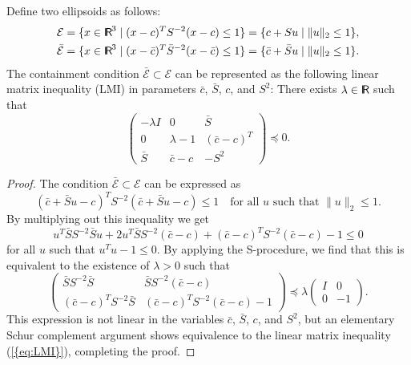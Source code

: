 \documentclass{siamltex}
\providecommand{\norm}[1]{\lVert#1\rVert}
\begin{document}
\begin{lemma}
\label{lem:S_procedure}
Define two ellipsoids as follows:
\begin{align*}
\mathcal{E} &= \{x\in{\makebox{\sf I \hspace{-8.5 pt} R \hspace{-4.0pt}}}^3 \mid (x-c)^T S^{-2} (x-c)\leq 1 \}  =
\{ c + S u \mid \norm{u}_2 \le 1 \},  \\
 \bar{\mathcal{E}} &= \{x\in{\makebox{\sf I \hspace{-8.5 pt} R \hspace{-4.0pt}}}^3 \mid (x-\bar{c})^T \bar{S}^{-2} (x-\bar{c})\leq 1 \}  =
\{\bar{c} + \bar{S}u \mid \norm{u}_2 \leq 1 \}.
\end{align*}
The containment condition $\bar{\mathcal{E}}\subset\mathcal{E}$ can be
represented as the following linear matrix inequality (LMI) in
parameters $\bar{c}$, $\bar{S}$, $c$, and $S^2$: There exists $\lambda
\in {\makebox{\sf I \hspace{-8.5 pt} R \hspace{-4.0pt}}}$ such that
\begin{equation}
\label{eq:LMI}
\begin{pmatrix} - \lambda I &0&\bar{S}\\0& \lambda-1&(\bar{c}-c)^T\\ \bar{S}&\bar{c}-c&-S^2 \end{pmatrix}\preceq 0.
\end{equation}
\end{lemma}
\begin{proof}
  The condition $\bar{\mathcal{E}} \subset \mathcal{E}$ can be
  expressed as
\[
(\bar{c} + \bar{S}u-c)^TS^{-2} (\bar{c} + \bar{S}u-c)\leq 1 \quad \textrm{for all } u  \textrm{ such that }  \norm{u}_2 \leq 1.
\]
By multiplying out this inequality we get
\[
u^T\bar{S}S^{-2}\bar{S}u+2u^T\bar{S}S^{-2} (\bar{c}-c)+(\bar{c}-c)^TS^{-2}(\bar{c}-c)-1\leq 0
\]
for all $u$ such that $u^Tu -1\leq 0$. By applying the S-procedure, we
find that this is equivalent to the existence of $\lambda > 0$ such
that
\begin{equation}
\label{eq:sproc}
\begin{pmatrix} \bar{S}S^{-2} \bar{S}&\bar{S}S^{-2} (\bar{c}-c)\\(\bar{c}-c)^TS^{-2}\bar{S}& (\bar{c}-c)^TS^{-2} (\bar{c}-c)-1\end{pmatrix}
\preceq\lambda\begin{pmatrix} I & 0\\0& -1\end{pmatrix}.
\end{equation}
This expression is not linear in the variables $\bar{c}$, $\bar{S}$,
$c$, and $S^2$, but an elementary Schur complement argument shows
equivalence to the linear matrix inequality {(\ref{{eq:LMI}})}, completing
the proof.
\end{proof}
\end{document}
